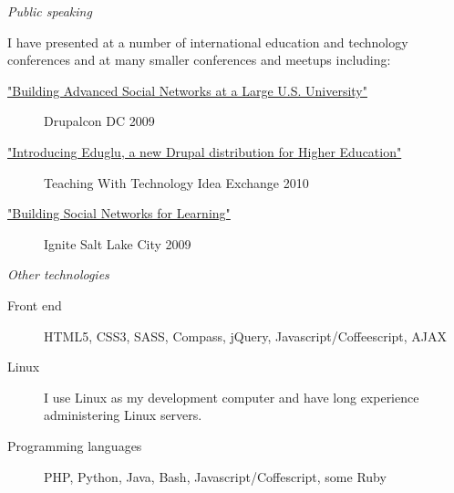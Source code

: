 \documentclass[11pt]{article}
\begin{document}
\medskip

\noindent\emph{Public speaking}

\medskip

\noindent I have presented at a number of international education and technology conferences and at many smaller conferences and meetups including:

\begin{description}
  \item[\href{http://www.archive.org/details/DrupalconDc2009-BuildingAdvancedSocialNetworksAtALargeU.s.University}{"Building Advanced Social Networks at a Large U.S. University"}] Drupalcon DC 2009
  \item[\href{http://ttix.org/archives/2010-sessions/introducing-eduglu-a-new-drupal-distribution-for-higher-education/}{"Introducing Eduglu, a new Drupal distribution for Higher Education"}] Teaching With Technology Idea Exchange 2010
  \item[\href{http://www.ignitesaltlake.com/ignite/index.cfm/videos/ignite-salt-lake-2/}{"Building Social Networks for Learning"}] Ignite Salt Lake City 2009
\end{description}

\bigskip

\noindent\emph{Other technologies}

\begin{description}
  \item[Front end] HTML5, CSS3, SASS, Compass, jQuery, Javascript/Coffeescript, AJAX
  \item[Linux] I use Linux as my development computer and have long experience administering Linux servers.
  \item[Programming languages] PHP, Python, Java, Bash, Javascript/Coffescript, some Ruby
\end{description}
\end{document}
